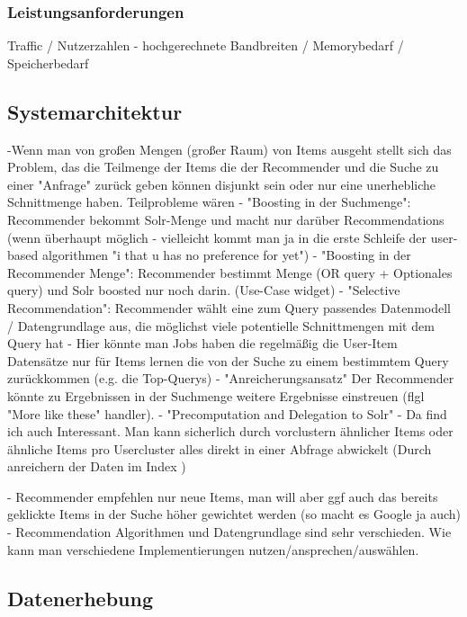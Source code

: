 \subsubsection{Leistungsanforderungen}

Traffic / Nutzerzahlen - hochgerechnete Bandbreiten / Memorybedarf / Speicherbedarf

\subsection{Systemarchitektur}



-Wenn man von großen Mengen (großer Raum) von Items ausgeht stellt sich das Problem, das die Teilmenge der Items die der Recommender und die Suche zu einer "Anfrage" zurück geben können disjunkt sein oder nur eine unerhebliche Schnittmenge haben. Teilprobleme wären
   - "Boosting in der Suchmenge": Recommender bekommt Solr-Menge und macht nur darüber Recommendations (wenn überhaupt möglich - vielleicht kommt man ja in die erste Schleife der user-based algorithmen "i that u has no preference for yet")
   - "Boosting in der Recommender Menge": Recommender bestimmt Menge (OR query + Optionales query) und Solr boosted nur noch darin. (Use-Case widget)
   -  "Selective Recommendation": Recommender wählt eine zum Query passendes Datenmodell / Datengrundlage aus, die möglichst viele potentielle Schnittmengen mit dem Query hat
       - Hier könnte man Jobs haben die regelmäßig die User-Item Datensätze nur für Items lernen die von der Suche zu einem bestimmtem Query zurückkommen (e.g. die Top-Querys)
   - "Anreicherungsansatz" Der Recommender könnte zu Ergebnissen in der Suchmenge weitere Ergebnisse einstreuen (flgl "More like these" handler).
   - "Precomputation and Delegation to Solr"
- Da find ich auch Interessant. Man kann sicherlich durch vorclustern ähnlicher Items oder ähnliche Items pro Usercluster alles direkt in einer Abfrage abwickelt  (Durch anreichern der Daten im Index )

- Recommender empfehlen nur neue Items, man will aber ggf auch das bereits geklickte Items in der Suche höher gewichtet werden (so macht es Google ja auch)
- Recommendation Algorithmen und Datengrundlage sind sehr verschieden. Wie kann man verschiedene Implementierungen nutzen/ansprechen/auswählen.


\subsection{Datenerhebung}

\newpage

